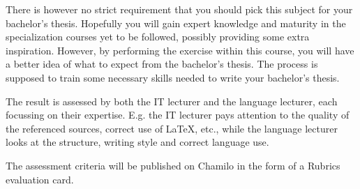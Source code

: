 There is however no strict requirement that you should pick this subject for your bachelor's thesis. Hopefully you will gain expert knowledge and maturity in the specialization courses yet to be followed, possibly providing some extra inspiration. However, by performing the exercise within this course, you will have a better idea of what to expect from the bachelor's thesis. The process is supposed to train some necessary skills needed to write your bachelor's thesis. 

The result is assessed by both the IT lecturer and the language lecturer, each focussing on their expertise. E.g. the IT lecturer pays attention to the quality of the referenced sources, correct use of {\LaTeX}, etc., while the language lecturer looks at the structure, writing style and correct language use.

The assessment criteria will be published on Chamilo in the form of a Rubrics evaluation card.